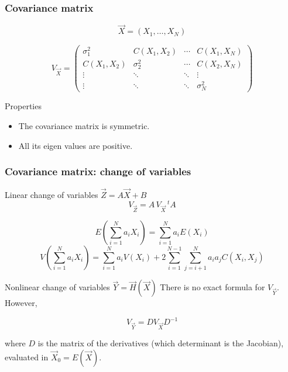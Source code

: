 \documentclass[9pt]{beamer}
\begin{document}
\begin{frame}
 \frametitle{Covariance matrix}
 
 \begin{block}{}
  $$\vec{X} = (X_1, \dots, X_N)$$
  
  $$V_{\vec{X}} = \begin{pmatrix}
                   \sigma_1^2 & C(X_1,X_2) & \cdots & C(X_1,X_N) \\
                   C(X_1,X_2) & \sigma_2^2 & \cdots & C(X_2,X_N) \\
                   \vdots & \ddots & \ddots &  \vdots \\
                   \vdots & \ddots & \ddots &  \sigma_N^2
                   \end{pmatrix}
$$
 \end{block}
 
 \begin{block}{Properties}
  \begin{itemize}
   \item The covariance matrix is symmetric.
   \item All its eigen values are positive.
  \end{itemize}

 \end{block}

\end{frame}

\begin{frame}
 \frametitle{Covariance matrix: change of variables}
 
 \begin{block}{Linear change of variables $\vec{Z} = A \vec{X} + B$}
  $$V_{\vec{Z}} = A\, V_{\vec{X}}\, ^t A$$
 \end{block}
 
 \begin{block}{}
  $$E \left( \sum_{i=1}^{N} a_i X_i \right) = \sum_{i=1}^{N} a_i E(X_i)$$
  $$V \left( \sum_{i=1}^{N} a_i X_i \right) = \sum_{i=1}^{N} a_i V(X_i) + 2 \sum_{i=1}^{N-1} \sum_{j=i+1}^{N} a_i a_j C(X_i,X_j)$$
 \end{block}

 \begin{block}{Nonlinear change of variables $\vec{Y} = \vec{H} (\vec{X})$}
  There is no exact formula for $V_{\vec{Y}}$. However,
  
  $$V_{\vec{Y}} = D V_{\vec{X}} D^{-1}$$
  
  where $D$ is the matrix of the derivatives (which determinant is the Jacobian), evaluated in $\vec{X}_0 = E(\vec{X})$.
 \end{block}


\end{frame}
\end{document}
